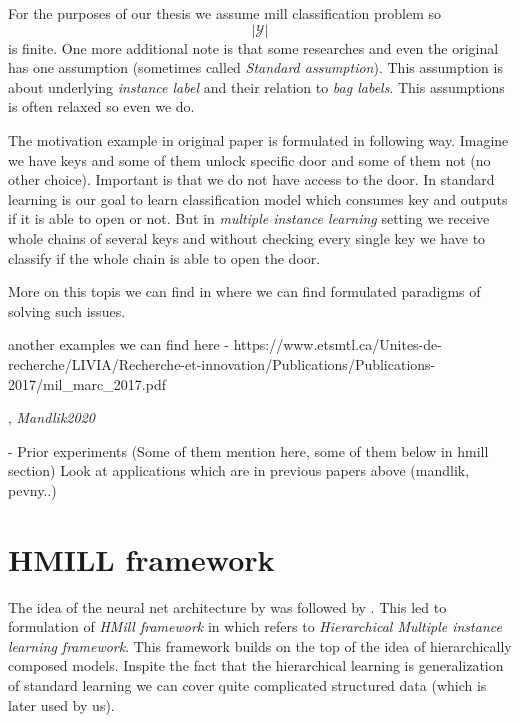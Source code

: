 For the purposes of our thesis we assume mill classification problem so $$|\mathcal{Y}|$$ is finite. One more additional note is that some researches and even the original has one assumption (sometimes called \emph{Standard assumption}). This assumption is about underlying \emph{instance label} and their relation to \emph{bag labels}. This assumptions is often relaxed \cite{Xu2003} so even we do.

 

The motivation example in original paper \cite{Dietterich1997} is formulated in following way. Imagine we have keys and some of them unlock specific door and some of them not (no other choice). Important is that we do not have access to the door. In standard learning is our goal to learn classification model which consumes key and outputs if it is able to open or not. But in \emph{multiple instance learning} setting we receive whole chains of several keys and without checking every single key we have to classify if the whole chain is able to open the door.

More on this topis we can find in \cite{Amores2013} where we can find formulated paradigms of solving such issues.

another examples we can find here - https://www.etsmtl.ca/Unites-de-recherche/LIVIA/Recherche-et-innovation/Publications/Publications-2017/mil_marc_2017.pdf


, \emph{Mandlik2020}  \cite{Pevny2016a} \cite{Pevny2017} \cite{PevnyDedic2020}
 \cite{Zaheer2018}

- Prior experiments (Some of them mention here, some of them below in hmill section)
    Look at applications which are in previous papers above (mandlik, pevny..)
        \cite{Stiborek2018}
        \cite{Janisch2020}
        \cite{PevnyDedic2020}
        \cite{PevnyKovarik2019a}
        \cite{Zaheer2018}

\section{HMILL framework}
The idea of the neural net architecture by  was followed by . This led to formulation of \emph{HMill framework} in \cite{Mandlik2020} which refers to \emph{Hierarchical Multiple instance learning framework}. This framework builds on the top of the idea of hierarchically composed models. Inspite the fact that the hierarchical learning is generalization of standard learning we can cover quite complicated structured data (which is later used by us).

